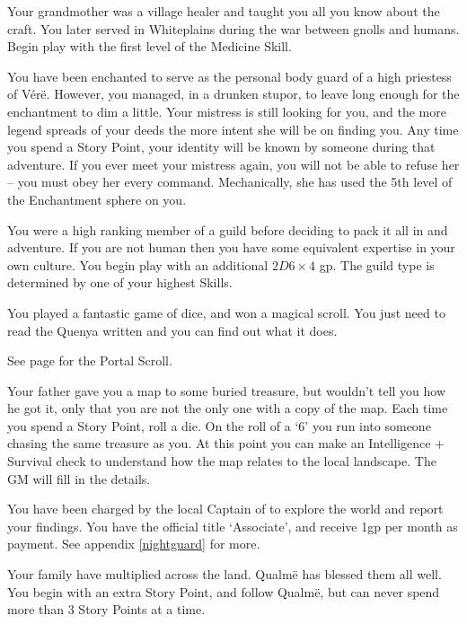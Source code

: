 \begin{multicols}{2}
\begin{list}{\addtocounter{list}{1}\textbf{:}}{\raggedleft}
	\item
	Your grandmother was a village healer and taught you all you know about the craft.
	You later served in Whiteplains during the war between gnolls and humans.
	Begin play with the first level of the Medicine Skill.

	\item
	You have been enchanted to serve as the personal body guard of a high priestess of V\'{e}r\"{e}.
	However, you managed, in a drunken stupor, to leave long enough for the enchantment to dim a little.
	Your mistress is still looking for you, and the more legend spreads of your deeds the more intent she will be on finding you.
	Any time you spend a Story Point, your identity will be known by someone during that adventure.
	If you ever meet your mistress again, you will not be able to refuse her -- you must obey her every command.
	Mechanically, she has used the 5th level of the Enchantment sphere on you.

	\item
	You were a high ranking member of a guild before deciding to pack it all in and adventure.
	If you are not human then you have some equivalent expertise in your own culture.
	You begin play with an additional $2D6\times4$ gp.
	The guild type is determined by one of your highest Skills.

	\item
	You played a fantastic game of dice, and won a magical scroll.
You just need to read the Quenya written and you can find out what it does.

See page \pageref{portalscroll} for the Portal Scroll.

	\item
	Your father gave you a map to some buried treasure, but wouldn't tell you how he got it, only that you are not the only one with a copy of the map.
	Each time you spend a Story Point, roll a die.
	On the roll of a `6' you run into someone chasing the same treasure as you.
	At this point you can make an Intelligence + Survival check to understand how the map relates to the local landscape.
	The GM will fill in the details.

	\item
	You have been charged by the local Captain of  to explore the world and report your findings.
	You have the official title `Associate', and receive 1gp per month as payment.
	See appendix \ref{nightguard} for more.

\item
Your family have multiplied across the land.
Qualm\"e has blessed them all well.
You begin with an extra Story Point, and follow Qualm\"e, but can never spend more than 3 Story Points at a time.


\end{list}
\end{multicols}
